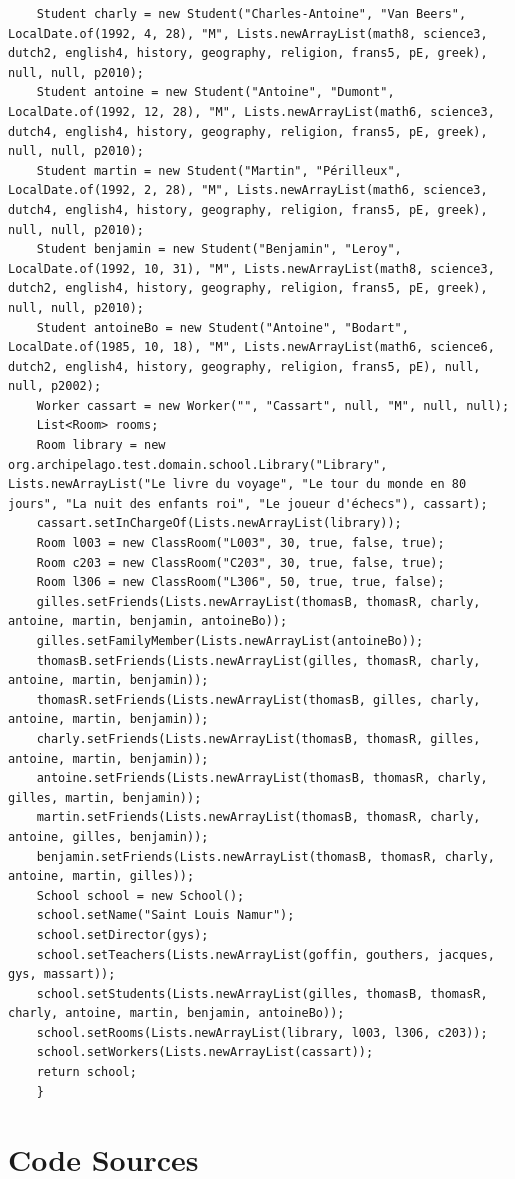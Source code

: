 \documentclass[a4paper,fleqn,12pt,oneside]{report}
\begin{document}
\begin{lstlisting}
    Student charly = new Student("Charles-Antoine", "Van Beers", LocalDate.of(1992, 4, 28), "M", Lists.newArrayList(math8, science3, dutch2, english4, history, geography, religion, frans5, pE, greek), null, null, p2010);
    Student antoine = new Student("Antoine", "Dumont", LocalDate.of(1992, 12, 28), "M", Lists.newArrayList(math6, science3, dutch4, english4, history, geography, religion, frans5, pE, greek), null, null, p2010);
    Student martin = new Student("Martin", "Périlleux", LocalDate.of(1992, 2, 28), "M", Lists.newArrayList(math6, science3, dutch4, english4, history, geography, religion, frans5, pE, greek), null, null, p2010);
    Student benjamin = new Student("Benjamin", "Leroy", LocalDate.of(1992, 10, 31), "M", Lists.newArrayList(math8, science3, dutch2, english4, history, geography, religion, frans5, pE, greek), null, null, p2010);
    Student antoineBo = new Student("Antoine", "Bodart", LocalDate.of(1985, 10, 18), "M", Lists.newArrayList(math6, science6, dutch2, english4, history, geography, religion, frans5, pE), null, null, p2002);
    Worker cassart = new Worker("", "Cassart", null, "M", null, null);
    List<Room> rooms;
    Room library = new org.archipelago.test.domain.school.Library("Library", Lists.newArrayList("Le livre du voyage", "Le tour du monde en 80 jours", "La nuit des enfants roi", "Le joueur d'échecs"), cassart);
    cassart.setInChargeOf(Lists.newArrayList(library));
    Room l003 = new ClassRoom("L003", 30, true, false, true);
    Room c203 = new ClassRoom("C203", 30, true, false, true);
    Room l306 = new ClassRoom("L306", 50, true, true, false);
    gilles.setFriends(Lists.newArrayList(thomasB, thomasR, charly, antoine, martin, benjamin, antoineBo));
    gilles.setFamilyMember(Lists.newArrayList(antoineBo));
    thomasB.setFriends(Lists.newArrayList(gilles, thomasR, charly, antoine, martin, benjamin));
    thomasR.setFriends(Lists.newArrayList(thomasB, gilles, charly, antoine, martin, benjamin));
    charly.setFriends(Lists.newArrayList(thomasB, thomasR, gilles, antoine, martin, benjamin));
    antoine.setFriends(Lists.newArrayList(thomasB, thomasR, charly, gilles, martin, benjamin));
    martin.setFriends(Lists.newArrayList(thomasB, thomasR, charly, antoine, gilles, benjamin));
    benjamin.setFriends(Lists.newArrayList(thomasB, thomasR, charly, antoine, martin, gilles));
    School school = new School();
    school.setName("Saint Louis Namur");
    school.setDirector(gys);
    school.setTeachers(Lists.newArrayList(goffin, gouthers, jacques, gys, massart));
    school.setStudents(Lists.newArrayList(gilles, thomasB, thomasR, charly, antoine, martin, benjamin, antoineBo));
    school.setRooms(Lists.newArrayList(library, l003, l306, c203));
    school.setWorkers(Lists.newArrayList(cassart));
    return school;
    }
\end{lstlisting}
\label{SchoolObj}

\chapter*{Code Sources}

%

 
\end{document}
